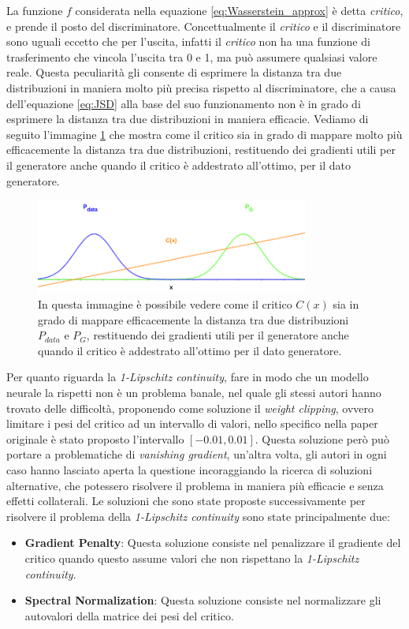 La funzione $f$ considerata nella equazione \ref{eq:Wasserstein_approx} è detta \textit{critico}, e prende il posto del discriminatore.
Concettualmente il \textit{critico} e il discriminatore sono uguali eccetto che per l'uscita, infatti il \textit{critico} non ha una funzione di trasferimento
che vincola l'uscita tra 0 e 1, ma può assumere qualsiasi valore reale.
Questa peculiarità gli consente di esprimere la distanza tra due distribuzioni in maniera molto più precisa rispetto al discriminatore,
che a causa dell'equazione \ref{eq:JSD} alla base del suo funzionamento non è in grado di esprimere la distanza tra due distribuzioni in maniera efficacie.
Vediamo di seguito l'immagine \ref{fig:critic} che mostra come il critico sia in grado di mappare molto più efficacemente la distanza tra due distribuzioni,
restituendo dei gradienti utili per il generatore anche quando il critico è addestrato all'ottimo, per il dato generatore.

    \begin{figure}[H]
        \centering
        \includegraphics[width=0.8\textwidth]{imgs/wgan_grphs/wgan_graph_2.png}
        \caption{In questa immagine è possibile vedere come il critico $C(x)$ sia in grado di mappare efficacemente la distanza tra due distribuzioni $P_{data}$ e $P_{G}$,
        restituendo dei gradienti utili per il generatore anche quando il critico è addestrato all'ottimo per il dato generatore.}
        \label{fig:critic}
    \end{figure}

Per quanto riguarda la \textit{1-Lipschitz continuity}, fare in modo che un modello neurale la rispetti non è un problema banale, nel quale gli stessi autori
hanno trovato delle difficoltà, proponendo come soluzione il \textit{weight clipping}, ovvero limitare i pesi del critico ad un intervallo di valori,
nello specifico nella paper originale è stato proposto l'intervallo $[-0.01,0.01]$.
Questa soluzione però può portare a problematiche di \textit{vanishing gradient}, un'altra volta, gli autori in ogni caso hanno lasciato aperta
la questione incoraggiando la ricerca di soluzioni alternative, che potessero risolvere il problema in maniera più efficacie e senza effetti collaterali.
Le soluzioni che sono state proposte successivamente per risolvere il problema della \textit{1-Lipschitz continuity} sono state principalmente due:
\begin{itemize}
    \item \textbf{Gradient Penalty}: Questa soluzione consiste nel penalizzare il gradiente del critico
    quando questo assume valori che non rispettano la \textit{1-Lipschitz continuity}.
    \item \textbf{Spectral Normalization}: Questa soluzione consiste nel normalizzare gli autovalori della matrice
    dei pesi del critico.
\end{itemize}

